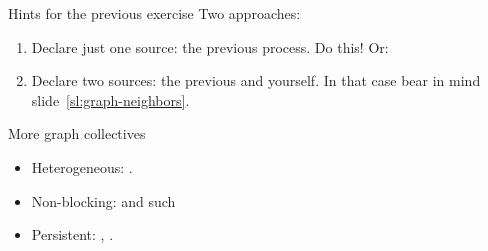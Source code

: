 \begin{numberedframe}{Hints for the previous exercise}
  Two approaches:
  \begin{enumerate}
  \item Declare just one source: the previous process. Do this! Or:
  \item Declare two sources: the previous and yourself.
    In that case bear in mind slide~\ref{sl:graph-neighbors}.
  \end{enumerate}
\end{numberedframe}

\begin{numberedframe}{More graph collectives}
  \begin{itemize}
  \item Heterogeneous: .
  \item Non-blocking:  and such
  \item Persistent:     ,
    .
  \end{itemize}
\end{numberedframe}

\endinput

\begin{numberedframe}{}
\end{numberedframe}

